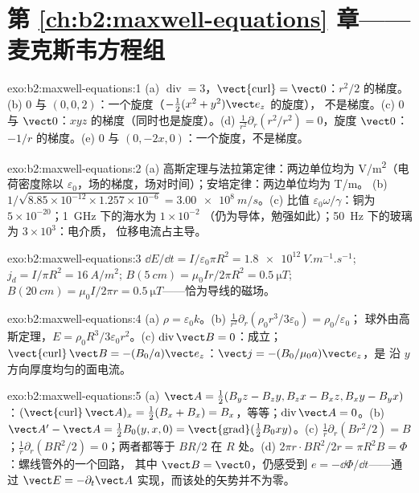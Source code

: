 \section*{第 \ref{ch:b2:maxwell-equations} 章——麦克斯韦方程组}

\begin{solution}{exo:b2:maxwell-equations:1}
(a) $\operatorname{div} = 3$，$\operatorname{\vect{curl}} = \vect 0$：$r^2/2$ 的梯度。
(b) $0$ 与 $(0, 0, 2)$：一个旋度（$-\tfrac12(x^2 + y^2)\vect e_z$ 的旋度），
不是梯度。(c) $0$ 与 $\vect 0$：$xyz$ 的梯度（同时也是旋度）。(d)
$\frac1{r^2}\partial_r(r^2/r^2) = 0$，旋度 $\vect 0$：$-1/r$ 的梯度。(e)
$0$ 与 $(0, -2x, 0)$：一个旋度，不是梯度。
\end{solution}

\begin{solution}{exo:b2:maxwell-equations:2}
(a) 高斯定理与法拉第定律：两边单位均为 \unit{V/m^2}（电荷密度除以
$\varepsilon_0$，场的梯度，场对时间）；安培定律：两边单位均为
\unit{T/m}。
(b) $1/\sqrt{8.85 \times 10^{-12} \times 1.257 \times 10^{-6}} = \qty{3.00e8}{m/s}$。(c) 比值
$\varepsilon_0\omega/\gamma$：铜为 $5 \times 10^{-20}$；\qty{1}{GHz} 下的海水为 $1 \times 10^{-2}$
（仍为导体，勉强如此）；\qty{50}{Hz} 下的玻璃为 $3 \times 10^3$：电介质，
位移电流占主导。
\end{solution}

\begin{solution}{exo:b2:maxwell-equations:3}
$\dd E/\dd t = I/\varepsilon_0\pi R^2 = \qty{1.8e12}{V.m^{-1}.s^{-1}}$; $j_d = I/\pi R^2 =
\qty{16}{A/m^2}$; $B(\qty{5}{cm}) = \mu_0Ir/2\pi R^2 = \qty{0.5}{\micro T}$; $B(\qty{20}{cm}) =
\mu_0I/2\pi r = \qty{0.5}{\micro T}$——恰为导线的磁场。
\end{solution}

\begin{solution}{exo:b2:maxwell-equations:4}
(a) $\rho = \varepsilon_0k$。(b) $\frac1{r^2}\partial_r(\rho_0r^3/3\varepsilon_0) = \rho_0/\varepsilon_0$；
球外由高斯定理，$E = \rho_0R^3/3\varepsilon_0r^2$。(c) $\operatorname{div}\vect B = 0$：成立；
$\operatorname{\vect{curl}}\vect B = -(B_0/a)\vect e_z$：$\vect j = -(B_0/\mu_0a)\vect e_z$，是
沿 $y$ 方向厚度均匀的面电流。
\end{solution}

\begin{solution}{exo:b2:maxwell-equations:5}
(a) $\vect A = \tfrac12(B_yz - B_zy, B_zx - B_xz, B_xy - B_yx)$：$(\operatorname{\vect{curl}}
\vect A)_x = \tfrac12(B_x + B_x) = B_x$，等等；$\operatorname{div}\vect A = 0$。(b)
$\vect A' - \vect A = \tfrac12B_0(y, x, 0) = \operatorname{\vect{grad}}(\tfrac12B_0xy)$。(c)
$\frac1r\partial_r(Br^2/2) = B$；$\frac1r\partial_r(BR^2/2) = 0$；两者都等于 $BR/2$
在 $R$ 处。(d) $2\pi r\cdot BR^2/2r = \pi R^2B = \Phi$：螺线管外的一个回路，
其中 $\vect B = \vect 0$，仍感受到 $e = -\dd\Phi/\dd t$——通过 $\vect E =
-\partial_t\vect A$ 实现，而该处的矢势并不为零。
\end{solution}

